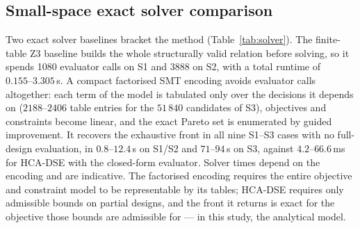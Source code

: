\documentclass[preprint,11pt,3p]{elsarticle}
\theoremstyle{plain}
\theoremstyle{definition}
\begin{document}
\subsection{Small-space exact solver comparison}
\label{sec:solver}
\providecommand{\RefFunnelSite}{Table~\ref{tab:funnel} and Fig.~\ref{fig:funnel}}
\providecommand{\RefFunnelTab}{Table~\ref{tab:funnel}}
\providecommand{\RefBaselinesTab}{Table~\ref{tab:baselines}}
\providecommand{\RefStatsTab}{Table~\ref{tab:stats}}
\providecommand{\RefHvFig}{Figure~\ref{fig:hv_budget}}
\providecommand{\RefCrossoverFig}{Fig.~\ref{fig:crossover}}
\providecommand{\RefAblationSite}{Table~\ref{tab:ablation} and Fig.~\ref{fig:ablation}}
\providecommand{\RefScalSite}{Table~\ref{tab:scalability} and Fig.~\ref{fig:scalability}}
\providecommand{\RefOrderTab}{Table~\ref{tab:order}}
\providecommand{\RefSolverTab}{Table~\ref{tab:solver}}
\providecommand{\RefDesTab}{Table~\ref{tab:des}}
\providecommand{\RefTestbedTab}{Table~\ref{tab:testbed}}
\providecommand{\RefReliabilityFig}{Fig.~\ref{fig:model_vs_measured}b}%
Two exact solver baselines bracket the method (\RefSolverTab{}). The finite-table Z3 baseline builds the whole structurally valid relation before solving, so it spends 1080 evaluator calls on S1 and 3888 on S2, with a total runtime of $0.155\text{--}3.305$\,s. A compact factorised SMT encoding avoids evaluator calls altogether: each term of the model is tabulated only over the decisions it depends on ($2188\text{--}2406$ table entries for the $51\,840$ candidates of S3), objectives and constraints become linear, and the exact Pareto set is enumerated by guided improvement. It recovers the exhaustive front in all nine S1--S3 cases with no full-design evaluation, in $0.8\text{--}12.4$\,s on S1/S2 and $71\text{--}94$\,s on S3, against $4.2\text{--}66.6$\,ms for HCA-DSE with the closed-form evaluator. Solver times depend on the encoding and are indicative. The factorised encoding requires the entire objective and constraint model to be representable by its tables; HCA-DSE requires only admissible bounds on partial designs, and the front it returns is exact for the objective those bounds are admissible for --- in this study, the analytical model.
\end{document}
